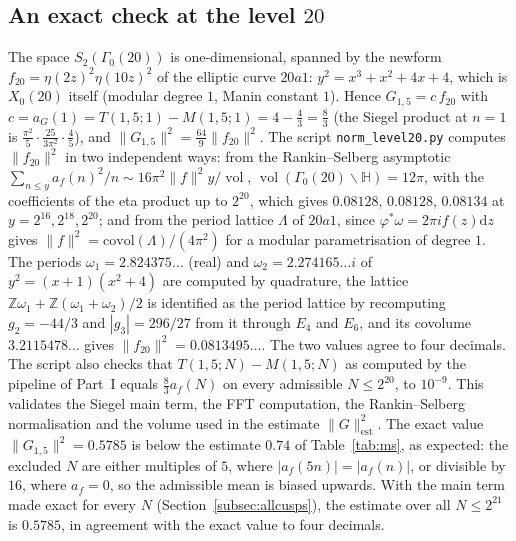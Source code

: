 ﻿\documentclass[11pt]{amsart}
\theoremstyle{remark}
\newcommand{\Z}{\mathbb{Z}}
\newcommand{\HH}{\mathbb{H}}
\newcommand{\dd}{\mathrm{d}}
\DeclareMathOperator{\vol}{vol}
\begin{document}
\subsection{An exact check at the level $20$}\label{subsec:exact}
The space $S_2(\Gamma_0(20))$ is one-dimensional, spanned by the newform $f_{20}=\eta(2z)^2\eta(10z)^2$ of the elliptic curve $20a1$: $y^2=x^3+x^2+4x+4$, which is $X_0(20)$ itself (modular degree $1$, Manin constant $1$). Hence $G_{1,5}=c\,f_{20}$ with $c=a_G(1)=T(1,5;1)-M(1,5;1)=4-\tfrac43=\tfrac83$ (the Siegel product at $n=1$ is $\frac{\pi^2}5\cdot\frac{25}{3\pi^2}\cdot\frac45$), and $\|G_{1,5}\|^2=\frac{64}9\|f_{20}\|^2$. The script \texttt{norm\_level20.py} computes $\|f_{20}\|^2$ in two independent ways: from the Rankin--Selberg asymptotic $\sum_{n\le y}a_f(n)^2/n\sim16\pi^2\|f\|^2y/\vol$, $\vol(\Gamma_0(20)\backslash\HH)=12\pi$, with the coefficients of the eta product up to $2^{20}$, which gives $0.08128$, $0.08128$, $0.08134$ at $y=2^{16},2^{18},2^{20}$; and from the period lattice $\Lambda$ of $20a1$, since $\varphi^*\omega=2\pi if(z)\dd z$ gives $\|f\|^2=\mathrm{covol}(\Lambda)/(4\pi^2)$ for a modular parametrisation of degree $1$. The periods $\omega_1=2.824375\ldots$ (real) and $\omega_2=2.274165\ldots i$ of $y^2=(x+1)(x^2+4)$ are computed by quadrature, the lattice $\Z\omega_1+\Z(\omega_1+\omega_2)/2$ is identified as the period lattice by recomputing $g_2=-44/3$ and $|g_3|=296/27$ from it through $E_4$ and $E_6$, and its covolume $3.2115478\ldots$ gives $\|f_{20}\|^2=0.0813495\ldots$. The two values agree to four decimals. The script also checks that $T(1,5;N)-M(1,5;N)$ as computed by the pipeline of Part~I equals $\frac83a_f(N)$ on every admissible $N\le2^{20}$, to $10^{-9}$. This validates the Siegel main term, the FFT computation, the Rankin--Selberg normalisation and the volume used in the estimate $\|G\|^2_{\mathrm{est}}$. The exact value $\|G_{1,5}\|^2=0.5785$ is below the estimate $0.74$ of Table~\ref{tab:ms}, as expected: the excluded $N$ are either multiples of $5$, where $|a_f(5n)|=|a_f(n)|$, or divisible by $16$, where $a_f=0$, so the admissible mean is biased upwards. With the main term made exact for every $N$ (Section~\ref{subsec:allcusps}), the estimate over all $N\le2^{21}$ is $0.5785$, in agreement with the exact value to four decimals.
\end{document}

